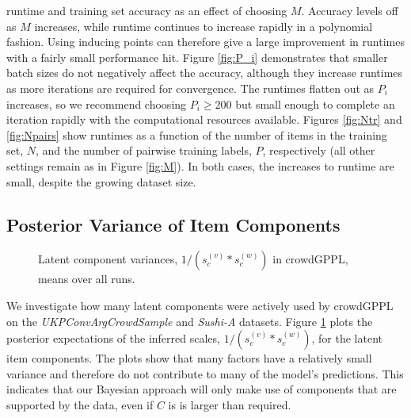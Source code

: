 runtime and training set accuracy as an effect of choosing $M$. 
Accuracy levels off as $M$ increases,
while runtime continues to increase rapidly in a polynomial fashion.
Using inducing points can therefore give a large improvement in runtimes 
with a fairly small performance hit.
Figure \ref{fig:P_i} demonstrates that
smaller batch sizes do not negatively affect the accuracy,
although they increase runtimes as more iterations are required for convergence.
The runtimes flatten out as $P_i$ increases, so we recommend choosing $P_i\geq 200$
but small enough to complete an iteration rapidly with the computational resources available.
Figures \ref{fig:Ntr} and \ref{fig:Npairs} show runtimes as a
function of the number of items in the training set, $N$,
and the number of pairwise training labels, $P$, respectively (all other settings remain as in Figure \ref{fig:M}).
In both cases, the increases to runtime are small, despite the growing dataset size.

\subsection{Posterior Variance of Item Components}
\label{sec:components}

\begin{figure}
\centering
{}
\caption{
Latent component variances, $1/(s^{(v)}_c * s^{(w)}_c)$ in crowdGPPL, means over all runs.
}
\label{fig:latent_factor_variance}
\end{figure}
We investigate how many latent components were actively used by 
 crowdGPPL on the \emph{UKPConvArgCrowdSample} and \emph{Sushi-A} datasets.
Figure \ref{fig:latent_factor_variance}
plots the posterior expectations of the inferred scales, $1/(s^{(v)}_c * s^{(w)}_c)$, for the latent item 
 components. 
 The plots show
that many factors have a relatively small variance and therefore do not contribute 
to many of the model's predictions. This indicates that 
our Bayesian approach will only make use of components that are supported by the data, 
even if $C$ is is larger than required.

